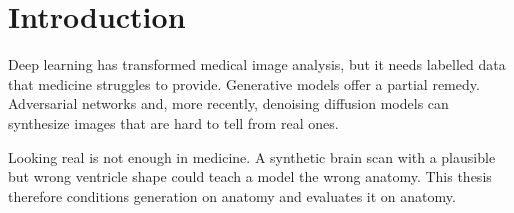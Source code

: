 \chapter{Introduction}
\label{ch:introduction}

Deep learning has transformed medical image analysis, but it needs labelled data that medicine
struggles to provide. Generative models offer a partial remedy. Adversarial networks
\citep{goodfellow2014} and, more recently, denoising diffusion models \citep{ho2020} can
synthesize images that are hard to tell from real ones.

Looking real is not enough in medicine. A synthetic brain scan with a plausible but wrong
ventricle shape could teach a model the wrong anatomy. This thesis therefore conditions
generation on anatomy and evaluates it on anatomy.
